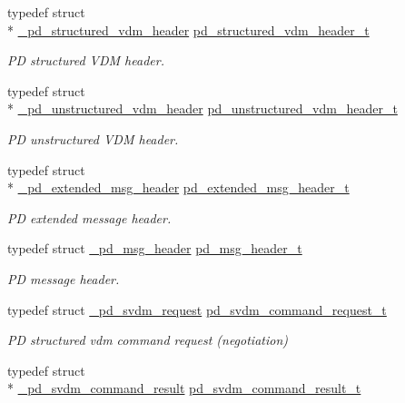 \begin{DoxyCompactItemize}
typedef struct \\*
\hyperlink{struct__pd__structured__vdm__header}{\-\_\-pd\-\_\-structured\-\_\-vdm\-\_\-header} \hyperlink{group__usb__pd__stack_ga245b8bec3f3b7771e73016ac98595570}{pd\-\_\-structured\-\_\-vdm\-\_\-header\-\_\-t}
\begin{DoxyCompactList}\small\item\em P\-D structured V\-D\-M header. \end{DoxyCompactList}\item 
typedef struct \\*
\hyperlink{struct__pd__unstructured__vdm__header}{\-\_\-pd\-\_\-unstructured\-\_\-vdm\-\_\-header} \hyperlink{group__usb__pd__stack_ga8e40e5f802e7758a04876e59a137c3b1}{pd\-\_\-unstructured\-\_\-vdm\-\_\-header\-\_\-t}
\begin{DoxyCompactList}\small\item\em P\-D unstructured V\-D\-M header. \end{DoxyCompactList}\item 
typedef struct \\*
\hyperlink{struct__pd__extended__msg__header}{\-\_\-pd\-\_\-extended\-\_\-msg\-\_\-header} \hyperlink{group__usb__pd__stack_gaac1fc676553ba20dd1712a8c7a63a3b0}{pd\-\_\-extended\-\_\-msg\-\_\-header\-\_\-t}
\begin{DoxyCompactList}\small\item\em P\-D extended message header. \end{DoxyCompactList}\item 
typedef struct \hyperlink{struct__pd__msg__header}{\-\_\-pd\-\_\-msg\-\_\-header} \hyperlink{group__usb__pd__stack_ga38ef16bfe01e9e07d6b3ac77648c6bee}{pd\-\_\-msg\-\_\-header\-\_\-t}
\begin{DoxyCompactList}\small\item\em P\-D message header. \end{DoxyCompactList}\item 
typedef struct \hyperlink{struct__pd__svdm__request}{\-\_\-pd\-\_\-svdm\-\_\-request} \hyperlink{group__usb__pd__stack_ga7861c86d4d4511f1621b379cf24fe7c9}{pd\-\_\-svdm\-\_\-command\-\_\-request\-\_\-t}
\begin{DoxyCompactList}\small\item\em P\-D structured vdm command request (negotiation) \end{DoxyCompactList}\item 
typedef struct \\*
\hyperlink{struct__pd__svdm__command__result}{\-\_\-pd\-\_\-svdm\-\_\-command\-\_\-result} \hyperlink{group__usb__pd__stack_ga89d37a53049e623f39d331b518280fbf}{pd\-\_\-svdm\-\_\-command\-\_\-result\-\_\-t}

\end{DoxyCompactItemize}
